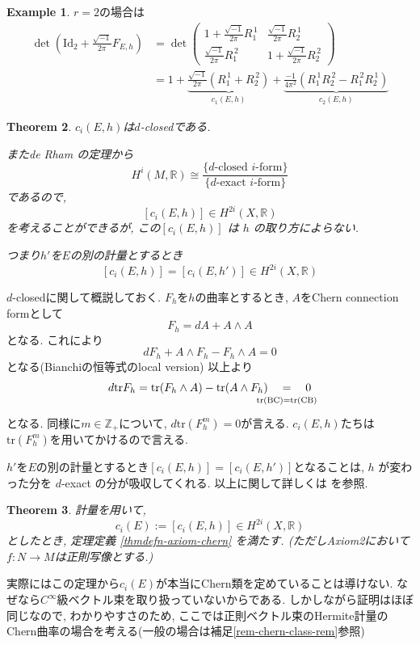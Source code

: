 \documentclass[dvipdfmx,a4paper,11pt]{article} %
\newtheorem{thm}{Theorem}[section]
\theoremstyle{definition}
\newtheorem{ex}[thm]{Example}
\theoremstyle{remark}
\numberwithin{equation}{section}
\newcommand{\underalign}[2]{\quad \underset{\mathclap{\strut #1}}{#2}\quad}
\newcommand{\R}{\mathbb{R}}
\newcommand{\N}{\mathbb{Z}_+}
\begin{document}
\begin{ex}
$r=2$の場合は
\begin{equation*}
\begin{aligned}
\det\left(\mathrm{Id}_2+\frac{\sqrt{-1}}{2\pi }F_{E,h}\right)
&=\det
\begin{pmatrix}
1+\frac{\sqrt{-1}}{2\pi }R_1^{\,1} & \frac{\sqrt{-1}}{2\pi }R_2^{\,1}\\
\frac{\sqrt{-1}}{2\pi }R_1^{\,2}  &1+\frac{\sqrt{-1}}{2\pi }R_2^{\,2}
\end{pmatrix}
\\
&=1+\underbrace{\frac{\sqrt{-1}}{2\pi }(R_1^{\,1}+ R_2^{\,2})}_{c_1(E, h)}+
\underbrace{\frac{-1}{4\pi^{2}} ( R_1^{\,1}R_2^{\,2}- R_1^{\,2}R_2^{\,1})}_{c_2(E, h)}
\end{aligned}
\end{equation*}
\end{ex}


\begin{thm}
$c_i(E, h)$は$d$-closedである. 

またde Rham の定理から
\[
H^{i}(M, \R) \cong \frac{ \{ \text{\(d\)-closed \(i\)-form}\}}{\{ \text{\(d\)-exact \(i\)-form}\}}
\]
であるので,
\[
[c_i(E, h)] \in H^{2i}(X, \R)
\]
を考えることができるが, この\([c_i(E, h)] \) は \(h\) の取り方によらない.

つまり$h'$を$E$の別の計量とするとき
$$
[c_i(E, h)] = [c_i(E, h')]  \in H^{2i}(X, \R)
$$
\end{thm}
$d$-closedに関して概説しておく.  
$F_{h}$を$h$の曲率とするとき, $A$をChern connection formとして
$$
F_h = dA + A \wedge A
$$
となる. これにより
$$
d F_h + A \wedge F_h - F_h \wedge A=0
$$
となる(Bianchiの恒等式のlocal version)
以上より
$$
d \mathrm{tr}F_h
= \mathrm{tr}(F_h \wedge A) - \mathrm{tr}( A \wedge F_h) 
\underalign{\text{tr(BC)=tr(CB)}}{=}0
$$
となる. 
同様に$m \in \N$について, $d \mathrm{tr}(F_h^{m})=0$が言える. $c_i(E, h)$たちは$ \mathrm{tr}(F_h^{m})$を用いてかけるので言える. 

$h'$を$E$の別の計量とするとき$[c_i(E, h)] = [c_i(E, h')]$となることは,  \(h\) が変わった分を \(d\)-exact の分が吸収してくれる. 
以上に関して詳しくは \cite[Ch.2 (2.2.5)]{Kob14} を参照.

\begin{thm}
\label{thm-chern-weil}
計量を用いて,
\[
c_i(E):=[c_i(E, h)] \in H^{2i}(X, \R)
\]
としたとき, 定理定義 \ref{thmdefn-axiom-chern} を満たす.
(ただしAxiom2において$f : N \to M$は正則写像とする.)
\end{thm}
実際にはこの定理から$c_i(E)$が本当にChern類を定めていることは導けない. 
なぜなら$C^\infty$級ベクトル束を取り扱っていないからである. 
しかしながら証明はほぼ同じなので, わかりやすさのため, ここでは正則ベクトル束のHermite計量のChern曲率の場合を考える(一般の場合は補足\ref{rem-chern-class-rem}参照)
\end{document}
